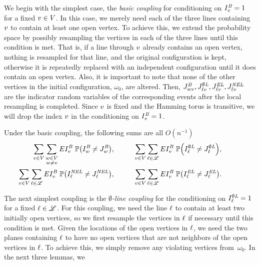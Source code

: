 We begin with the simplest case, the {\em basic coupling} for conditioning on $I^{\text{\em B}}_{{ v}} = 1$ for a fixed ${ v}\in V$.  In this case, we merely need each of the three lines containing ${ v}$ to contain at least one open vertex.  To achieve this, we extend the probability space by possibly resampling the vertices in each of the three lines until this condition is met.  That is, if a line through ${ v}$ already contains an open vertex, nothing is resampled for that line, and the original configuration is kept, otherwise it is repeatedly replaced with an independent configuration until it does contain an open vertex.  Also, it is important to note that none of the other vertices in the initial configuration, $\omega_0$, are altered.  Then, $J^{\text{\em B}}_{{ wv}}, J^{\emptyset\text{\em L}}_{\ell{ v}}, J^{\text{\em EL}}_{\ell{ v}}, J^{\text{\em NEL}}_{\ell{ v}}$ are the indicator random variables of the corresponding events after the local resampling is completed.  Since ${ v}$ is fixed and the Hamming torus is transitive, we will drop the index ${ v}$ in the conditioning on $I^{\text{\em B}}_{{ v}}=1$.  %
\begin{lemma}
\label{basic-coupling-lem}
Under the basic coupling, the following sums are all $O(n^{-1})$
\begin{align*}
\sum_{\vect{v}\in V} \sum_{\substack{\vect{w}\in V \\ \vect{w}\neq\vect{v}}} E\B_{\vect{v}}\ \prob{\left(\B_{\vect{w}} \neq \JB_{\vect{w}}\right)}, & \hspace{1cm} \sum_{\vect{v}\in V} \sum_{\Ln \in \lineset} E\B_{\vect{v}}\ \prob{\left(\OL_\Ln \neq \JOL_\Ln\right)},
\hspace{1cm}  \\
\sum_{\vect{v}\in V} \sum_{\Ln \in \lineset} E\B_{\vect{v}}\ \prob{\left(\NEL_\Ln \neq \JNEL_\Ln\right)}, &\hspace{1cm} \sum_{\vect{v}\in V} \sum_{\Ln \in \lineset} E\B_{\vect{v}}\ \prob{\left(\EL_\Ln \neq \JEL_\Ln\right)}.
\end{align*}
\end{lemma}
The next simplest coupling is the {\em $\emptyset$-line coupling} for the conditioning on $I^{\emptyset\text{\em L}}_\ell = 1$ for a fixed $\ell \in \mathscr{L}$.  For this coupling, we need the line $\ell$ to contain at least two initially open vertices, so we first resample the vertices in $\ell$ if necessary until this condition is met.  Given the locations of the open vertices in $\ell$, we need the two planes containing $\ell$ to have no open vertices that are not neighbors of the open vertices in $\ell$.  To achieve this, we simply remove any violating vertices from~$\omega_0$.  In the next three lemmas, we
